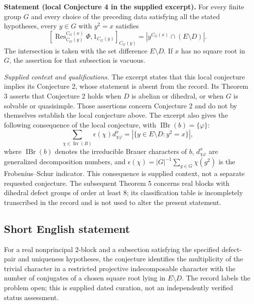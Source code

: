 \documentclass[11pt]{article}
\begin{document}
\textbf{Statement (local Conjecture 4 in the supplied excerpt).} For every finite group \(G\) and every choice of the preceding data satisfying all the stated hypotheses, every \(y\in G\) with \(y^2=x\) satisfies
\[
 \left[\operatorname{Res}^{C_G(x)}_{C_G(y)}\Phi,1_{C_G(y)}\right]_{C_G(y)}
 =\left|y^{C_G(x)}\cap(E\setminus D)\right|.
\]
The intersection is taken with the set difference \(E\setminus D\). If \(x\) has no square root in \(G\), the assertion for that subsection is vacuous.

\textit{Supplied context and qualifications.} The excerpt states that this local conjecture implies its Conjecture 2, whose statement is absent from the record. Its Theorem 3 asserts that Conjecture 2 holds when \(D\) is abelian or dihedral, or when \(G\) is solvable or quasisimple. Those assertions concern Conjecture 2 and do not by themselves establish the local conjecture above. The excerpt also gives the following consequence of the local conjecture, with \(\operatorname{IBr}(b)=\{\varphi\}\):
\[
 \sum_{\chi\in\operatorname{Irr}(B)}\epsilon(\chi)d^x_{\chi\varphi}
 =\left|\{y\in E\setminus D:y^2=x\}\right|,
\]
where \(\operatorname{IBr}(b)\) denotes the irreducible Brauer characters of \(b\), \(d^x_{\chi\varphi}\) are generalized decomposition numbers, and \(\epsilon(\chi)=|G|^{-1}\sum_{g\in G}\chi(g^2)\) is the Frobenius--Schur indicator. This consequence is supplied context, not a separate requested conjecture. The subsequent Theorem 5 concerns real blocks with dihedral defect groups of order at least \(8\); its classification table is incompletely transcribed in the record and is not used to alter the present statement.
\subsection{Short English statement}
For a real nonprincipal \(2\)-block and a subsection satisfying the specified defect-pair and uniqueness hypotheses, the conjecture identifies the multiplicity of the trivial character in a restricted projective indecomposable character with the number of conjugates of a chosen square root lying in \(E\setminus D\). The record labels the problem open; this is supplied dated curation, not an independently verified status assessment.
\end{document}
